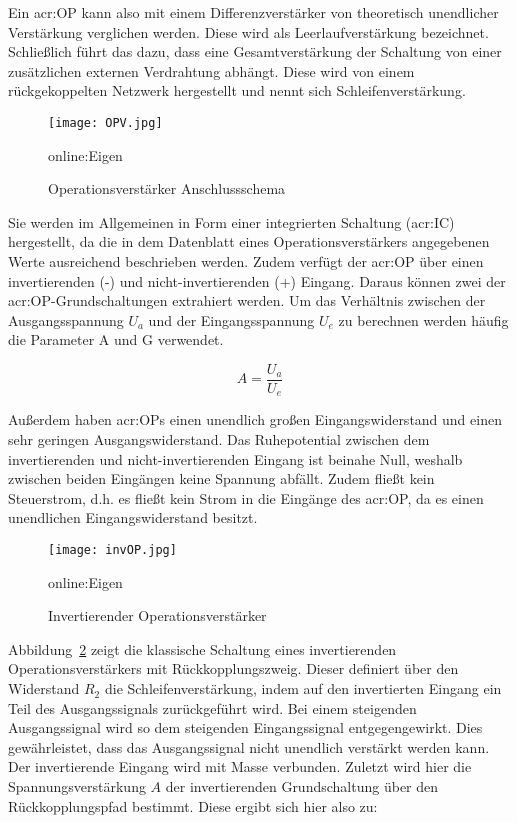 Ein \gls{acr:OP} kann also mit einem Differenzverstärker von theoretisch unendlicher Verstärkung verglichen werden. Diese wird als Leerlaufverstärkung bezeichnet. Schließlich führt das dazu, dass eine Gesamtverstärkung der Schaltung von einer zusätzlichen externen Verdrahtung abhängt. Diese wird von einem rückgekoppelten Netzwerk hergestellt und nennt sich Schleifenverstärkung.\cite{lutzHalbleiterLeistungsbauelemente2012}

\begin{figure}[H]
	\centering
	\texttt{[image: OPV.jpg]}
	\caption[Operationsverstärker Anschlussschema]{Operationsverstärker Anschlussschema} 
	\gls{online:Eigen}
	\label{fig:OPV}
\end{figure}

Sie werden im Allgemeinen in Form einer integrierten Schaltung (\gls{acr:IC}) hergestellt, da die in dem Datenblatt eines Operationsverstärkers angegebenen Werte ausreichend beschrieben werden. Zudem verfügt der \gls{acr:OP} über einen invertierenden (-) und nicht-invertierenden (+) Eingang.\cite{OP} Daraus können zwei der \gls{acr:OP}-Grundschaltungen extrahiert werden. Um das Verhältnis zwischen der Ausgangsspannung $U_{a}$ und der Eingangsspannung $U_{e}$ zu berechnen werden häufig die Parameter A und G verwendet.\cite{tietzeElectronicCircuits2008}

\begin{equation}
	\label{equ:bsp1}
	A = \frac{U_{a}}{U_{e}}
\end{equation}

Außerdem haben \gls{acr:OP}s einen unendlich großen Eingangswiderstand und einen sehr geringen Ausgangswiderstand.
Das Ruhepotential zwischen dem invertierenden und nicht-invertierenden Eingang ist beinahe Null, weshalb zwischen beiden Eingängen keine Spannung abfällt.\cite{tietzeElectronicCircuits2008} Zudem fließt kein Steuerstrom, d.h. es fließt kein Strom in die Eingänge des \gls{acr:OP}, da es einen unendlichen Eingangswiderstand besitzt.\cite{OP}

\begin{figure}[H]
	\centering
	\texttt{[image: invOP.jpg]}
	\caption[Invertierender Operationsverstärker]{Invertierender Operationsverstärker} 
	\gls{online:Eigen}
	\label{fig:ninvOP}
\end{figure}

Abbildung~\ref{fig:ninvOP} zeigt die klassische Schaltung eines invertierenden Operationsverstärkers mit
Rückkopplungszweig. Dieser definiert über den Widerstand $R_{2}$ die Schleifenverstärkung, indem auf den invertierten Eingang ein Teil des Ausgangssignals zurückgeführt wird.  Bei einem steigenden Ausgangssignal wird so dem steigenden Eingangssignal entgegengewirkt. Dies gewährleistet, dass das Ausgangssignal nicht unendlich verstärkt werden kann. Der invertierende Eingang wird mit Masse verbunden. Zuletzt wird hier die Spannungsverstärkung $A$ der invertierenden Grundschaltung über den Rückkopplungspfad bestimmt. Diese ergibt sich hier also zu: 

